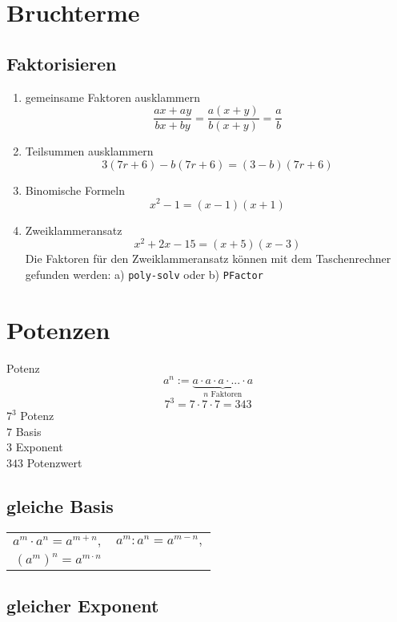 \begin{multicols}{2}
\hrulefill

\section*{Bruchterme}
\subsection*{Faktorisieren}
\begin{rezept*}{}{}
\begin{enumerate}
\item gemeinsame Faktoren ausklammern
$$\frac{ax+ay}{bx+by} =\frac{a(x+y)}{b(x+y)} = \frac{a}b$$
\item Teilsummen ausklammern
$$3(7r+6) - b(7r+6) = (3-b)(7r+6)$$
\item Binomische Formeln
$$x^2-1 = (x-1)(x+1)$$
\item Zweiklammeransatz
$$x^2+2x-15 = (x+5)(x-3)$$
Die Faktoren für den Zweiklammeransatz können mit dem Taschenrechner
gefunden werden: a) \texttt{poly-solv} 
oder b) \texttt{PFactor} 
\end{enumerate}
\end{rezept*}


\section*{Potenzen}
\begin{definition*}{Potenz}{}
$$a^n := \underbrace{a\cdot{}a\cdot{}a\cdot{}...\cdot{}a}_{n\textrm{ Faktoren}}$$
$$7^3=7\cdot{}7\cdot{}7=343$$
$7^3$ Potenz\\
$7$ Basis\\
$3$ Exponent\\
$343$ Potenzwert\\
\end{definition*}

\subsection*{gleiche Basis}
\begin{tabular}{cc}
$a^m\cdot{}a^n = a^{m+n},$ & $a^m:a^n=a^{m-n},$ \\
$\left(a^m\right)^n = a^{m\cdot{}n}$ &\\
 \end{tabular} 

\subsection*{gleicher Exponent}


\end{multicols}

